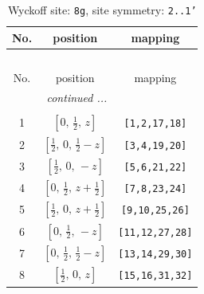 \documentclass[fleqn,8pt]{jsarticle}
\begin{document}
\begin{longtable}{ccc}
\caption{Wyckoff site: {\tt 8g}, site symmetry: {\tt 2..1'}}
 \\
 \hline \hline
No. & position & mapping \\ \hline \endfirsthead

\multicolumn{2}{l}{\tablename\ \thetable{}} \\
 \hline \hline
No. & position & mapping \\ \hline \endhead

 \hline \hline
\multicolumn{2}{r}{\footnotesize\it continued ...} \\ \endfoot

 \hline \hline
\multicolumn{2}{r}{} \\ \endlastfoot

1 & $\left[ 0,\, \frac{1}{2},\, z \right]$ & {\tt [1,2,17,18]} \\ \hline
2 & $\left[ \frac{1}{2},\, 0,\, \frac{1}{2} - z \right]$ & {\tt [3,4,19,20]} \\ \hline
3 & $\left[ \frac{1}{2},\, 0,\, - z \right]$ & {\tt [5,6,21,22]} \\ \hline
4 & $\left[ 0,\, \frac{1}{2},\, z + \frac{1}{2} \right]$ & {\tt [7,8,23,24]} \\ \hline
5 & $\left[ \frac{1}{2},\, 0,\, z + \frac{1}{2} \right]$ & {\tt [9,10,25,26]} \\ \hline
6 & $\left[ 0,\, \frac{1}{2},\, - z \right]$ & {\tt [11,12,27,28]} \\ \hline
7 & $\left[ 0,\, \frac{1}{2},\, \frac{1}{2} - z \right]$ & {\tt [13,14,29,30]} \\ \hline
8 & $\left[ \frac{1}{2},\, 0,\, z \right]$ & {\tt [15,16,31,32]} \\
\end{longtable}
\renewcommand{\arraystretch}{1.2}
\end{document}
